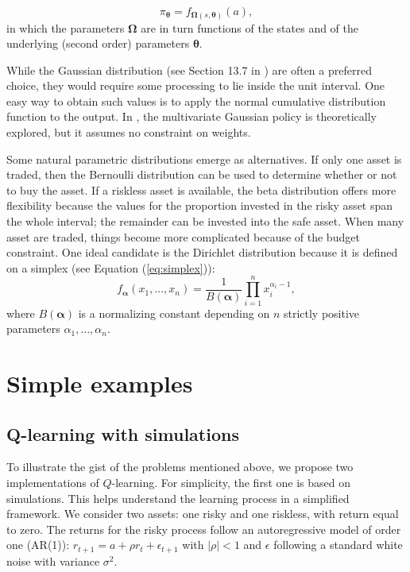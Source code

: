 \documentclass[]{krantz}
\theoremstyle{definition}
\theoremstyle{definition}
\theoremstyle{definition}
\theoremstyle{remark}
\begin{document}
\begin{equation}
\label{eq:parpol}
\pi_{\boldsymbol{\theta}} = f_{\boldsymbol{\Omega}(s,\boldsymbol{\theta})}(a),
\end{equation} in which the parameters \(\boldsymbol{\Omega}\) are in
turn functions of the states and of the underlying (second order)
parameters \(\boldsymbol{\theta}\).

While the Gaussian distribution (see Section 13.7 in
\citet{sutton2018reinforcement}) are often a preferred choice, they
would require some processing to lie inside the unit interval. One easy
way to obtain such values is to apply the normal cumulative distribution
function to the output. In \citet{wang2019continuous}, the multivariate
Gaussian policy is theoretically explored, but it assumes no constraint
on weights.

Some natural parametric distributions emerge as alternatives. If only
one asset is traded, then the Bernoulli distribution can be used to
determine whether or not to buy the asset. If a riskless asset is
available, the beta distribution offers more flexibility because the
values for the proportion invested in the risky asset span the whole
interval; the remainder can be invested into the safe asset. When many
asset are traded, things become more complicated because of the budget
constraint. One ideal candidate is the Dirichlet distribution because it
is defined on a simplex (see Equation (\eqref{eq:simplex})):
\[f_{\boldsymbol{\alpha}}(x_1,\dots,x_n)=\frac{1}{B(\boldsymbol{\alpha})}\prod_{i=1}^nx_i^{\alpha_i-1},\]
where \(B(\boldsymbol{\alpha})\) is a normalizing constant depending on
\(n\) strictly positive parameters \(\alpha_1, \dots, \alpha_n\).

\hypertarget{simple-examples}{%
\section{Simple examples}\label{simple-examples}}

\hypertarget{q-learning-with-simulations}{%
\subsection{Q-learning with
simulations}\label{q-learning-with-simulations}}

To illustrate the gist of the problems mentioned above, we propose two
implementations of \(Q\)-learning. For simplicity, the first one is
based on simulations. This helps understand the learning process in a
simplified framework. We consider two assets: one risky and one
riskless, with return equal to zero. The returns for the risky process
follow an autoregressive model of order one (AR(1)):
\(r_{t+1}=a+\rho r_t+\epsilon_{t+1}\) with \(|\rho|<1\) and \(\epsilon\)
following a standard white noise with variance \(\sigma^2\).
\end{document}
